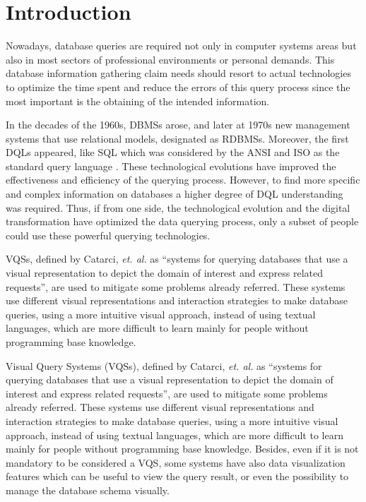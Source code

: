 \newcommand{\novathesis}{\emph{novathesis}}
\newcommand{\novathesisclass}{\texttt{novathesis.cls}}


\chapter{Introduction}
\label{cha:introduction}
Nowadays, database queries are required not only in computer systems areas but also in most sectors of professional environments or personal demands. This database information gathering claim needs should resort to actual technologies to optimize the time spent and reduce the errors of this query process since the most important is the obtaining of the intended information.

In the decades of the 1960s, \glspl{DBMS} arose, and later at 1970s new management systems that use relational models, designated as \glspl{RDBMS}. Moreover, the first \glspl{DQL} appeared, like \gls{SQL} \cite{sequel_aStructuredEnglishQueryLanguage} which was considered by the \gls{ANSI} and \gls{ISO} as the standard query language \cite{databaseManagementSystems}. These technological evolutions have improved the effectiveness and efficiency of the querying process. However, to find more specific and complex information on databases a higher degree of \gls{DQL} understanding was required. Thus, if from one side, the technological evolution and the digital transformation have optimized the data querying process, only a subset of people could use these powerful querying technologies.

\Glspl{VQS}, defined by Catarci, \textit{et. al.} \cite{visualQuerySystemsForDatabases_aSurvey} as “systems for querying databases that use a visual representation to depict the domain of interest and express related requests”, are used to mitigate some problems already referred. These systems use different visual representations and interaction strategies to make database queries, using a more intuitive visual approach, instead of using textual languages, which are more difficult to learn mainly for people without programming base knowledge.

Visual Query Systems (VQSs), defined by Catarci, \textit{et. al.} \cite{visualQuerySystemsForDatabases_aSurvey} as “systems for querying databases that use a visual representation to depict the domain of interest and express related requests”, are used to mitigate some problems already referred. These systems use different visual representations and interaction strategies to make database queries, using a more intuitive visual approach, instead of using textual languages, which are more difficult to learn mainly for people without programming base knowledge. Besides, even if it is not mandatory to be considered a \gls{VQS}, some systems have also data visualization features which can be useful to view the query result, or even the possibility to manage the database schema visually.

